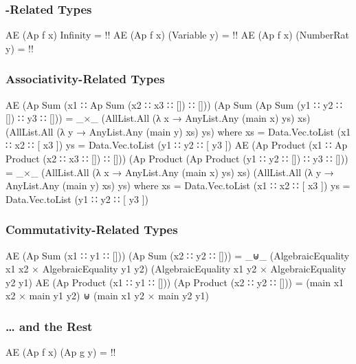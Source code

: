 \documentclass{report}
\begin{document}
\subsubsection{-Related Types}

\begin{code}
  AE (Ap f x) Infinity = {!!}
  AE (Ap f x) (Variable y) = {!!}
  AE (Ap f x) (NumberRat y) = {!!}
\end{code}

\subsubsection{Associativity-Related Types}

\begin{code}
  AE (Ap Sum (x1 ∷ Ap Sum (x2 ∷ x3 ∷ []) ∷ []))
     (Ap Sum (Ap Sum (y1 ∷ y2 ∷ []) ∷ y3 ∷ [])) =
     _×_ (AllList.All (λ x → AnyList.Any (main x) ys) xs)
         (AllList.All (λ y → AnyList.Any (main y) xs) ys)
     where
     xs = Data.Vec.toList (x1 ∷ x2 ∷ [ x3 ])
     ys = Data.Vec.toList (y1 ∷ y2 ∷ [ y3 ])
  AE (Ap Product (x1 ∷ Ap Product (x2 ∷ x3 ∷ []) ∷ []))
     (Ap Product (Ap Product (y1 ∷ y2 ∷ []) ∷ y3 ∷ [])) =
     _×_ (AllList.All (λ x → AnyList.Any (main x) ys) xs)
         (AllList.All (λ y → AnyList.Any (main y) xs) ys)
     where
     xs = Data.Vec.toList (x1 ∷ x2 ∷ [ x3 ])
     ys = Data.Vec.toList (y1 ∷ y2 ∷ [ y3 ])
\end{code}

\subsubsection{Commutativity-Related Types}

\begin{code}
  AE (Ap Sum (x1 ∷ y1 ∷ [])) (Ap Sum (x2 ∷ y2 ∷ [])) =
    _⊎_ (AlgebraicEquality x1 x2 × AlgebraicEquality y1 y2)
        (AlgebraicEquality x1 y2 × AlgebraicEquality y2 y1)
  AE (Ap Product (x1 ∷ y1 ∷ [])) (Ap Product (x2 ∷ y2 ∷ [])) =
    (main x1 x2 × main y1 y2) ⊎ (main x1 y2 × main y2 y1)
\end{code}

\subsubsection{\ldots{} and the Rest}

\begin{code}
  AE (Ap f x) (Ap g y) = {!!}
\end{code}
\end{document}
